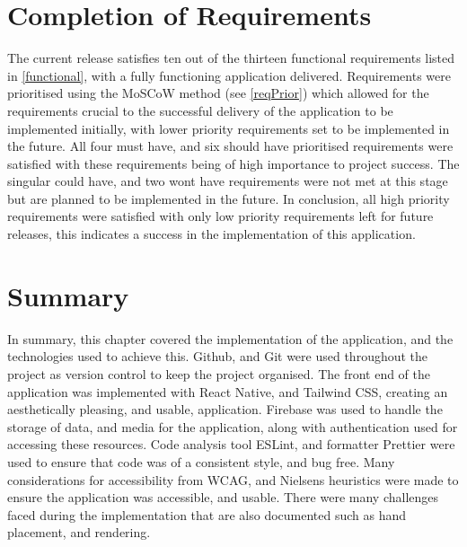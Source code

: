 \section{Completion of Requirements}
The current release satisfies ten out of the thirteen functional requirements listed in \ref{functional}, with a fully functioning application delivered. Requirements were prioritised using the MoSCoW method (see \ref{reqPrior}) which allowed for the requirements crucial to the successful delivery of the application to be implemented initially, with lower priority requirements set to be implemented in the future. All four must have, and six should have prioritised requirements were satisfied with these requirements being of high importance to project success. The singular could have, and two wont have requirements were not met at this stage but are planned to be implemented in the future. In conclusion, all high priority requirements were satisfied with only low priority requirements left for future releases, this indicates a success in the implementation of this application.


\section{Summary}

In summary, this chapter covered the implementation of the application, and the technologies used to achieve this. Github, and Git were used throughout the project as version control to keep the project organised. The front end of the application was implemented with React Native, and Tailwind CSS, creating an aesthetically pleasing, and usable, application. Firebase was used to handle the storage of data, and media for the application, along with authentication used for accessing these resources. Code analysis tool ESLint, and formatter Prettier were used to ensure that code was of a consistent style, and bug free. Many considerations for accessibility from WCAG, and Nielsens heuristics were made to ensure the application was accessible, and usable. There were many challenges faced during the implementation that are also documented such as hand placement, and rendering.